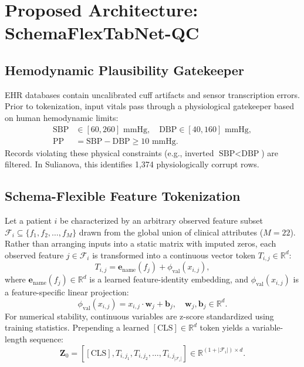 \documentclass[journal]{IEEEtran}
\begin{document}
\section{Proposed Architecture: SchemaFlexTabNet-QC}

\subsection{Hemodynamic Plausibility Gatekeeper}
EHR databases contain uncalibrated cuff artifacts and sensor transcription errors. Prior to tokenization, input vitals pass through a physiological gatekeeper based on human hemodynamic limits:
\begin{align}
\text{SBP} &\in [60, 260]\text{ mmHg}, \quad \text{DBP} \in [40, 160]\text{ mmHg}, \\
\text{PP} &= \text{SBP} - \text{DBP} \ge 10\text{ mmHg}.
\end{align}
Records violating these physical constraints (e.g., inverted $\text{SBP} < \text{DBP}$) are filtered. In Sulianova, this identifies 1,374 physiologically corrupt rows.

\subsection{Schema-Flexible Feature Tokenization}
Let a patient $i$ be characterized by an arbitrary observed feature subset $\mathcal{F}_i \subseteq \{f_1, f_2, \dots, f_M\}$ drawn from the global union of clinical attributes ($M=22$). Rather than arranging inputs into a static matrix with imputed zeros, each observed feature $j \in \mathcal{F}_i$ is transformed into a continuous vector token $T_{i,j} \in \mathbb{R}^d$:
\begin{equation}
T_{i,j} = \mathbf{e}_{\text{name}}(f_j) + \phi_{\text{val}}(x_{i,j}),
\end{equation}
where $\mathbf{e}_{\text{name}}(f_j) \in \mathbb{R}^d$ is a learned feature-identity embedding, and $\phi_{\text{val}}(x_{i,j})$ is a feature-specific linear projection:
\begin{equation}
\phi_{\text{val}}(x_{i,j}) = x_{i,j} \cdot \mathbf{w}_j + \mathbf{b}_j, \quad \mathbf{w}_j, \mathbf{b}_j \in \mathbb{R}^d.
\end{equation}
For numerical stability, continuous variables are z-score standardized using training statistics. Prepending a learned $[\text{CLS}] \in \mathbb{R}^d$ token yields a variable-length sequence:
\begin{equation}
\mathbf{Z}_0 = [ [\text{CLS}], T_{i,j_1}, T_{i,j_2}, \dots, T_{i,j_{|\mathcal{F}_i|}} ] \in \mathbb{R}^{(1 + |\mathcal{F}_i|) \times d}.
\end{equation}
\end{document}
